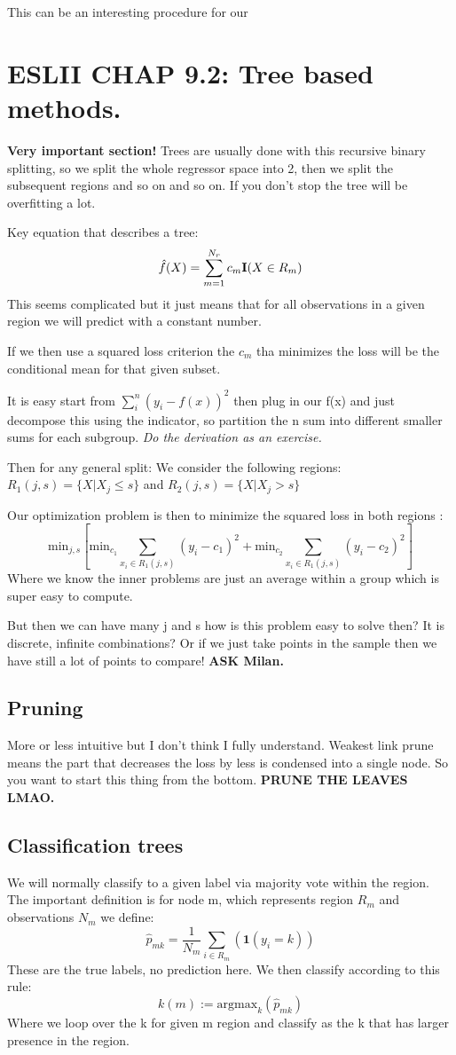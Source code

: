 \documentclass{article}
\begin{document}
This can be an interesting procedure for our 

\section*{ESLII CHAP 9.2: Tree based methods.}
\textbf{Very important section!}
Trees are usually done with this recursive binary splitting, so we split the whole regressor space into 2, then we split the subsequent regions and so on and so on. If you don't stop the tree will be overfitting a lot.

Key equation that describes a tree: 
$$\hat{f}(X) = \sum_{m=1}^{N_r} c_m \textrm{\textbf{I}}(X \in R_m)$$
This seems complicated but it just means that for all observations in a given region we will predict with a constant number.

If we then use a squared loss criterion the $c_m$ tha minimizes the loss will be the conditional mean for that given subset.

It is easy start from $\sum_i^n(y_i -f(x))^2$ then plug in our f(x) and just decompose this using the indicator, so partition the n sum into different smaller sums for each subgroup.
\textit{Do the derivation as an exercise.}

Then for any general split:
We consider the following regions: $R_1(j,s) = \{ X| X_j \leq s \}$ and $R_2(j,s) = \{ X| X_j > s \}$

Our optimization problem is then to minimize the squared loss in both regions : 
$$ \textrm{min}_{j,s}[\textrm{min}_{c_1} \sum_{x_i \in R_1(j,s)}(y_i-c_1)^2 + \textrm{min}_{c_2} \sum_{x_i \in R_1(j,s)}(y_i-c_2)^2  ]$$
Where we know the inner problems are just an average within a group which is super easy to compute.

But then we can have many j and s how is this problem easy to solve then? It is discrete, infinite combinations? Or if we just take points in the sample then we have still a lot of points to compare! \textbf{ASK Milan.}

\subsection*{Pruning}
More or less intuitive but I don't think I fully understand. Weakest link prune means the part that decreases the loss by less is condensed into a single node. So you want to start this thing from the bottom. \textbf{PRUNE THE LEAVES LMAO.}

\subsection*{Classification trees}
We will normally classify to a given label via majority vote within the region.
The important definition is for node m, which represents region $R_m$ and observations $N_m$ we define: 
$$\hat{p}_{mk} = \frac{1}{N_m}\sum_{i \in R_m}(\textbf{1}(y_i = k))$$
These are the true labels, no prediction here.
We then classify according to this rule: $$k(m) := \textrm{argmax}_{k} (\hat{p}_{mk})$$
Where we loop over the k for given m region and classify as the k that has larger presence in the region.
\end{document}
